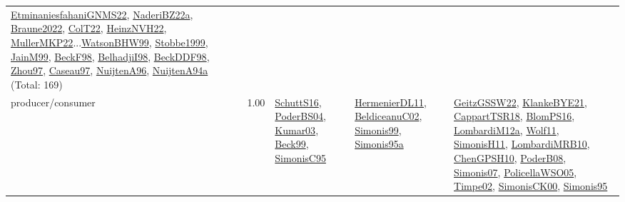 {\begin{longtable}{p{3cm}r>{\raggedright\arraybackslash}p{6cm}>{\raggedright\arraybackslash}p{6cm}>{\raggedright\arraybackslash}p{8cm}}
\hyperref[detail:EtminaniesfahaniGNMS22]{EtminaniesfahaniGNMS22}, \hyperref[detail:NaderiBZ22a]{NaderiBZ22a}, \hyperref[detail:Braune2022]{Braune2022}, \hyperref[detail:ColT22]{ColT22}, \hyperref[detail:HeinzNVH22]{HeinzNVH22}, \hyperref[detail:MullerMKP22]{MullerMKP22}...\hyperref[detail:WatsonBHW99]{WatsonBHW99}, \hyperref[detail:Stobbe1999]{Stobbe1999}, \hyperref[detail:JainM99]{JainM99}, \hyperref[detail:BeckF98]{BeckF98}, \hyperref[detail:BelhadjiI98]{BelhadjiI98}, \hyperref[detail:BeckDDF98]{BeckDDF98}, \hyperref[detail:Zhou97]{Zhou97}, \hyperref[detail:Caseau97]{Caseau97}, \hyperref[detail:NuijtenA96]{NuijtenA96}, \hyperref[detail:NuijtenA94a]{NuijtenA94a} (Total: 169)\\
\index{producer/consumer}\index{Concepts!producer/consumer}producer/consumer &  1.00 & \hyperref[detail:SchuttS16]{SchuttS16}, \hyperref[detail:PoderBS04]{PoderBS04}, \hyperref[detail:Kumar03]{Kumar03}, \hyperref[detail:Beck99]{Beck99}, \hyperref[detail:SimonisC95]{SimonisC95} & \hyperref[detail:HermenierDL11]{HermenierDL11}, \hyperref[detail:BeldiceanuC02]{BeldiceanuC02}, \hyperref[detail:Simonis99]{Simonis99}, \hyperref[detail:Simonis95a]{Simonis95a} & \hyperref[detail:GeitzGSSW22]{GeitzGSSW22}, \hyperref[detail:KlankeBYE21]{KlankeBYE21}, \hyperref[detail:CappartTSR18]{CappartTSR18}, \hyperref[detail:BlomPS16]{BlomPS16}, \hyperref[detail:LombardiM12a]{LombardiM12a}, \hyperref[detail:Wolf11]{Wolf11}, \hyperref[detail:SimonisH11]{SimonisH11}, \hyperref[detail:LombardiMRB10]{LombardiMRB10}, \hyperref[detail:ChenGPSH10]{ChenGPSH10}, \hyperref[detail:PoderB08]{PoderB08}, \hyperref[detail:Simonis07]{Simonis07}, \hyperref[detail:PolicellaWSO05]{PolicellaWSO05}, \hyperref[detail:Timpe02]{Timpe02}, \hyperref[detail:SimonisCK00]{SimonisCK00}, \hyperref[detail:Simonis95]{Simonis95}\\

\end{longtable}}

